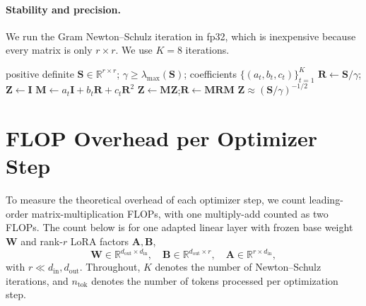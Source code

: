 \documentclass{article}
\newcommand{\mat}[1]{\bm{#1}}
\begin{document}
\paragraph{Stability and precision.}
We run the Gram Newton--Schulz iteration in fp32, which is inexpensive because
every matrix is only $r\times r$.  We use $K=8$ iterations.


\begin{algorithm}[ht]
\caption{Gram Newton--Schulz iteration}
\label{alg:gramns}
\begin{algorithmic}[1]
\Require positive definite $\mat{S} \in \mathbb{R}^{r \times r}$; $\gamma \ge \lambda_{\max}(\mat{S})$; coefficients $\{(a_t,b_t,c_t)\}_{t=1}^{K}$
\Statex\vspace{-0.5\baselineskip}
\State $\mat{R}\gets \mat{S}/\gamma$;\quad $\mat{Z}\gets \mat{I}$ \Comment{normalize so $\lambda_{\max}(\mat{R})\le 1$}
  \State $\mat{M}\gets a_t \mat{I}+b_t \mat{R}+c_t \mat{R}^2$
  \State $\mat{Z}\gets \mat{M}\mat{Z}$;\quad $\mat{R}\gets \mat{M}\mat{R}\mat{M}$
\EndFor
\State \Return $\mat{Z}\approx (\mat{S}/\gamma)^{-1/2}$
\end{algorithmic}
\end{algorithm}







\section{FLOP Overhead per Optimizer Step}
\label{app:flops}
To measure the theoretical overhead of each optimizer step, we count
leading-order matrix-multiplication FLOPs, with one multiply-add counted as two
FLOPs.  The count below is for one
adapted linear layer with frozen base weight $\mat{W}$ and rank-$r$ LoRA factors
$\mat{A},\mat{B}$,
\[
  \mat{W}\in\mathbb{R}^{d_{\mathrm{out}}\times d_{\mathrm{in}}},\quad
  \mat{B}\in\mathbb{R}^{d_{\mathrm{out}}\times r},\quad
  \mat{A}\in\mathbb{R}^{r\times d_{\mathrm{in}}},
\]
with $r\ll d_{\mathrm{in}},d_{\mathrm{out}}$.  Throughout, $K$ denotes the number
of Newton--Schulz iterations, and $n_{\mathrm{tok}}$ denotes the number of tokens
processed per optimization step.
\end{document}
